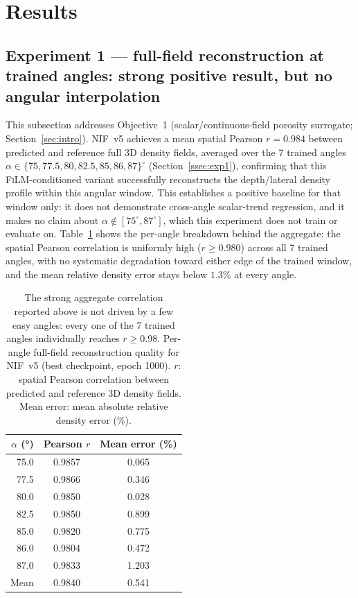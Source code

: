 \documentclass[aip,amsmath,amssymb,reprint]{revtex4-1}
\renewcommand{\ang}{\ensuremath{\alpha}} %
\newcommand{\nif}{\textsc{NIF}}
\newcommand{\film}{\textsc{FiLM}}
\begin{document}
\section{Results}
\label{sec:results}

\subsection{Experiment 1 — full-field reconstruction at trained angles: strong positive result, but no angular interpolation}
\label{ssec:res1}

This subsection addresses Objective~1 (scalar/continuous-field
porosity surrogate; Section~\ref{sec:intro}).
\nif{}~v5 achieves a mean spatial Pearson $r = 0.984$ between
predicted and reference full 3D density fields, averaged over
the 7 trained angles $\ang \in \{75, 77.5, 80, 82.5, 85, 86, 87\}^{\circ}$
(Section~\ref{ssec:exp1}), confirming that this \film{}-conditioned
variant successfully reconstructs the depth/lateral density
profile within this angular window.
This establishes a positive baseline for that window only: it does
not demonstrate cross-angle scalar-trend regression, and it makes
no claim about $\ang \notin [75^{\circ},87^{\circ}]$, which this experiment does
not train or evaluate on.
Table~\ref{tab:nifv5_peralpha} shows the per-angle breakdown behind
the aggregate: the spatial Pearson correlation is uniformly high
($r \geq 0.980$) across all 7 trained angles, with no systematic
degradation toward either edge of the trained window, and the mean
relative density error stays below $1.3\%$ at every angle.

\begin{table}[htbp]
  \centering
  \caption{%
    The strong aggregate correlation reported above is not driven by
    a few easy angles: every one of the 7 trained angles individually
    reaches $r \geq 0.98$.
    Per-angle full-field reconstruction quality for \nif{}~v5
    (best checkpoint, epoch 1000). $r$: spatial Pearson correlation
    between predicted and reference 3D density fields.
    Mean error: mean absolute relative density error (\%).
  }
  \label{tab:nifv5_peralpha}
  \begin{tabular}{rcc}
    \toprule
    $\ang$ (°) & Pearson $r$ & Mean error (\%) \\
    \midrule
    75.0 & 0.9857 & 0.065 \\
    77.5 & 0.9866 & 0.346 \\
    80.0 & 0.9850 & 0.028 \\
    82.5 & 0.9850 & 0.899 \\
    85.0 & 0.9820 & 0.775 \\
    86.0 & 0.9804 & 0.472 \\
    87.0 & 0.9833 & 1.203 \\
    \midrule
    Mean & 0.9840 & 0.541 \\
    \bottomrule
  \end{tabular}
\end{table}
\end{document}
